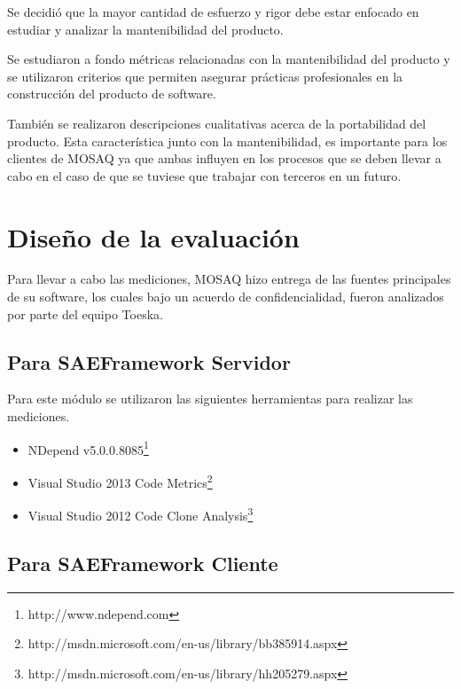 Se decidió que la mayor cantidad de esfuerzo y rigor debe estar enfocado en estudiar y
analizar la mantenibilidad del producto. 

Se estudiaron a fondo métricas relacionadas con la mantenibilidad del producto y se
utilizaron criterios que permiten asegurar prácticas profesionales en la construcción
del producto de software.

También se realizaron descripciones cualitativas acerca de la portabilidad del producto.
Esta característica junto con la mantenibilidad, es importante para los clientes de MOSAQ
ya que ambas influyen en los procesos que se deben llevar a cabo en el caso de que se tuviese
que trabajar con terceros en un futuro.
\label{chap:validation}

\section{Diseño de la evaluación}
Para llevar a cabo las mediciones, MOSAQ hizo entrega de las fuentes principales de su software, 
los cuales bajo un acuerdo de confidencialidad, fueron analizados por parte del equipo Toeska.

\subsection{Para SAEFramework Servidor}
Para este módulo se utilizaron las siguientes herramientas para realizar las mediciones.

\begin{itemize}
\item NDepend v5.0.0.8085\footnote{http://www.ndepend.com}
\item Visual Studio 2013 Code Metrics\footnote{http://msdn.microsoft.com/en-us/library/bb385914.aspx}
\item Visual Studio 2012 Code Clone Analysis\footnote{http://msdn.microsoft.com/en-us/library/hh205279.aspx}
\end{itemize}

\subsection{Para SAEFramework Cliente}

